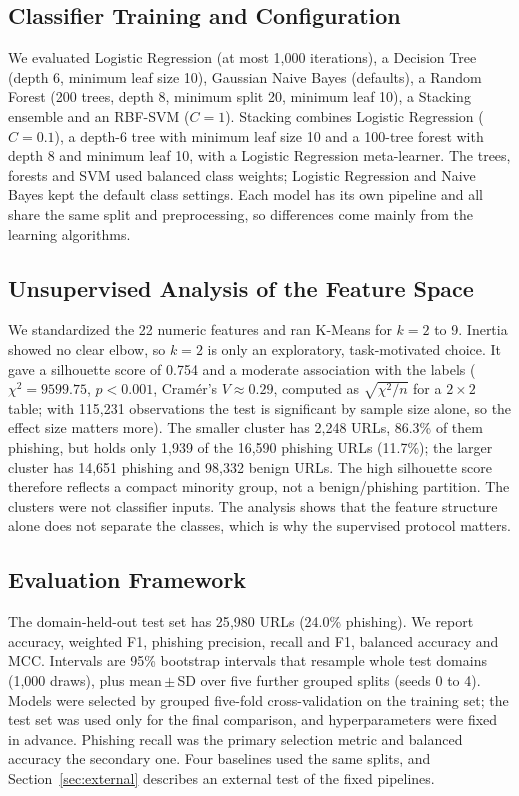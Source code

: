 \documentclass[conference]{IEEEtran}
\begin{document}
\subsection{Classifier Training and Configuration}
We evaluated Logistic Regression (at most 1{,}000 iterations), a Decision Tree (depth 6, minimum leaf size 10), Gaussian Naive Bayes (defaults), a Random Forest (200 trees, depth 8, minimum split 20, minimum leaf 10), a Stacking ensemble and an RBF-SVM ($C=1$). Stacking combines Logistic Regression ($C=0.1$), a depth-6 tree with minimum leaf size 10 and a 100-tree forest with depth 8 and minimum leaf 10, with a Logistic Regression meta-learner. The trees, forests and SVM used balanced class weights; Logistic Regression and Naive Bayes kept the default class settings. Each model has its own pipeline and all share the same split and preprocessing, so differences come mainly from the learning algorithms.

\subsection{Unsupervised Analysis of the Feature Space}
We standardized the 22 numeric features and ran K-Means for $k=2$ to 9. Inertia showed no clear elbow, so $k=2$ is only an exploratory, task-motivated choice. It gave a silhouette score of 0.754 and a moderate association with the labels ($\chi^2=9599.75$, $p<0.001$, Cram\'er's $V\approx0.29$, computed as $\sqrt{\chi^2/n}$ for a $2\times2$ table; with 115{,}231 observations the test is significant by sample size alone, so the effect size matters more). The smaller cluster has 2{,}248 URLs, 86.3\% of them phishing, but holds only 1{,}939 of the 16{,}590 phishing URLs (11.7\%); the larger cluster has 14{,}651 phishing and 98{,}332 benign URLs. The high silhouette score therefore reflects a compact minority group, not a benign/phishing partition. The clusters were not classifier inputs. The analysis shows that the feature structure alone does not separate the classes, which is why the supervised protocol matters.

\subsection{Evaluation Framework}
The domain-held-out test set has 25{,}980 URLs (24.0\% phishing). We report accuracy, weighted F1, phishing precision, recall and F1, balanced accuracy and MCC. Intervals are 95\% bootstrap intervals that resample whole test domains (1{,}000 draws), plus mean\,$\pm$\,SD over five further grouped splits (seeds 0 to 4). Models were selected by grouped five-fold cross-validation on the training set; the test set was used only for the final comparison, and hyperparameters were fixed in advance. Phishing recall was the primary selection metric and balanced accuracy the secondary one. Four baselines used the same splits, and Section~\ref{sec:external} describes an external test of the fixed pipelines.
\end{document}

